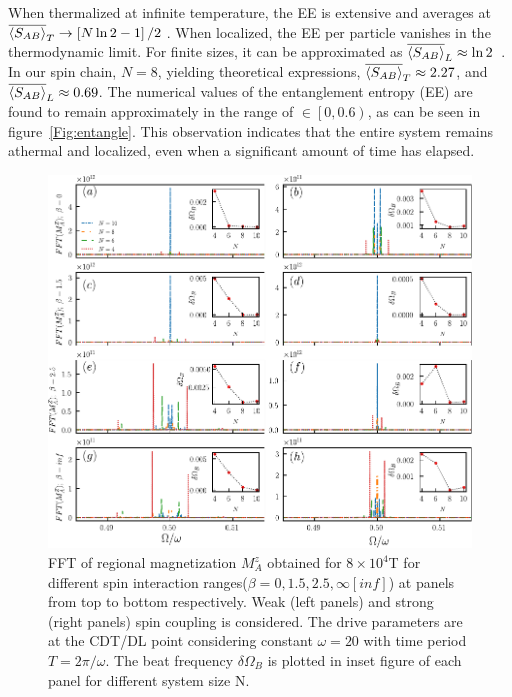 \documentclass[12pt]{iopart}
\begin{document}
When thermalized at infinite temperature, the EE is extensive and averages at $\displaystyle \overline{\expval{S_{AB}}}_T\rightarrow \left[N \ln{2}-1\right]/2$ \cite{Lu2021}. When localized, the EE per particle vanishes in the thermodynamic limit. For finite sizes, it can be approximated as $\overline{\expval{S_{AB}}}_L\approx \ln{2}$~\cite{sakurai_phys_nodate}. In our spin chain, $N=8$, yielding theoretical expressions, $\overline{\expval{S_{AB}}}_T\approx 2.27$, and $\overline{\expval{S_{AB}}}_L\approx 0.69$. The numerical values of the entanglement entropy (EE) are found to remain approximately in the range of $\in\left[0,0.6\right)$, as can be seen in figure~\ref{Fig:entangle}. This observation indicates that the entire system remains athermal and localized, even when a significant amount of time has elapsed.
\begin{figure}[h!]
	\begin{center}
		\includegraphics[width=12cm]{figure12.pdf}
	\end{center}
	\caption{FFT of regional magnetization $M^z_A$ obtained for $8\times10^4$T for different spin interaction ranges($\beta = 0,1.5,2.5, \infty[inf]$) at panels from top to bottom respectively. Weak (left panels) and strong (right panels) spin coupling is considered. The drive parameters are at the CDT/DL point considering constant $\omega = 20$ with time period $T= 2\pi/\omega$. The beat frequency $\delta\Omega_B$ is plotted in inset figure of each panel for different system size N.}
	\label{Fig:size_dependence}
\end{figure}		
\end{document}
